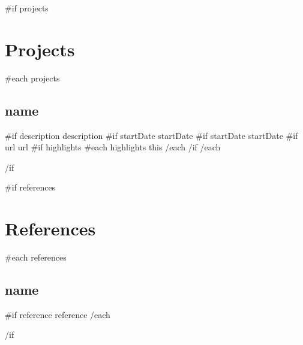 \documentclass[letterpaper]{article}
\begin{document}
\begin{paracol}{2}
\begin{rightcolumn}
  {{#if projects}}
  \section*{Projects} {
    {{#each projects}}
    \subsection*{ {{ name }} } {
      {{#if description}}{{ description }}
      {{#if startDate}}{{ startDate }}
      {{#if startDate}}{{ startDate }}
      {{#if url}}{{ url }}
      {{#if highlights}}
        {{#each highlights}}
          {{ this }} 
        {{/each}}\newline
      {{/if}}
    }
    {{/each}}
  }
  {{/if}}

  {{#if references}}
  \section*{References} {
    {{#each references}}
    \subsection*{ {{ name }} } {
      {{#if reference}}{{ reference }}
    }
    {{/each}}
  }
  {{/if}}

\end{rightcolumn}
\end{paracol}
\end{document}

